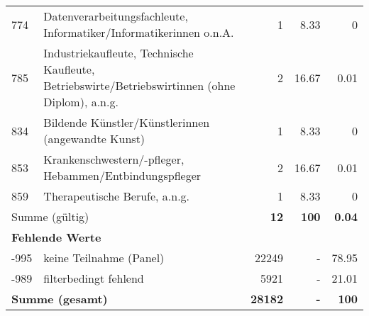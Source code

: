 \begin{longtable}{lXrrr}
     774 &
     \multicolumn{1}{X}{ Datenverarbeitungsfachleute, Informatiker/Informatikerinnen o.n.A.   } &


       \num{1} &
       \num[round-mode=places,round-precision=2]{8.33} &
         \num[round-mode=places,round-precision=2]{0} \\

     785 &
     \multicolumn{1}{X}{ Industriekaufleute, Technische Kaufleute, Betriebswirte/Betriebswirtinnen (ohne Diplom), a.n.g.   } &


       \num{2} &
       \num[round-mode=places,round-precision=2]{16.67} &
         \num[round-mode=places,round-precision=2]{0.01} \\

     834 &
     \multicolumn{1}{X}{ Bildende Künstler/Künstlerinnen (angewandte Kunst)   } &


       \num{1} &
       \num[round-mode=places,round-precision=2]{8.33} &
         \num[round-mode=places,round-precision=2]{0} \\

     853 &
     \multicolumn{1}{X}{ Krankenschwestern/-pfleger, Hebammen/Entbindungspfleger   } &


       \num{2} &
       \num[round-mode=places,round-precision=2]{16.67} &
         \num[round-mode=places,round-precision=2]{0.01} \\

     859 &
     \multicolumn{1}{X}{ Therapeutische Berufe, a.n.g.   } &


       \num{1} &
       \num[round-mode=places,round-precision=2]{8.33} &
         \num[round-mode=places,round-precision=2]{0} \\
     \midrule
     \multicolumn{2}{l}{Summe (gültig)} &
       \textbf{\num{12}} &
     \textbf{\num{100}} &
       \textbf{\num[round-mode=places,round-precision=2]{0.04}} \\
     \multicolumn{5}{l}{\textbf{Fehlende Werte}}\\
       -995 &
       keine Teilnahme (Panel) &
         \num{22249} &
        - &
         \num[round-mode=places,round-precision=2]{78.95} \\
       -989 &
       filterbedingt fehlend &
         \num{5921} &
        - &
         \num[round-mode=places,round-precision=2]{21.01} \\
     \midrule
     \multicolumn{2}{l}{\textbf{Summe (gesamt)}} &
          \textbf{\num{28182}} &
        \textbf{-} &
        \textbf{\num{100}} \\
     \bottomrule
     \end{longtable}
     
